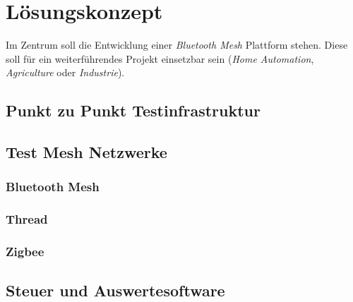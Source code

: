 \clearpage
\section{Lösungskonzept}\label{sec:Loesungskonzept}


Im Zentrum soll die Entwicklung einer \textit{Bluetooth Mesh} Plattform stehen. Diese soll für ein weiterführendes Projekt einsetzbar sein (\textit{Home Automation}, \textit{Agriculture} oder \textit{Industrie}). 

\subsection{Punkt zu Punkt Testinfrastruktur}\label{subsec:PunktzuPunktTestinfrastruktur}


\subsection{Test Mesh Netzwerke}\label{subsec:TestMeshNetzwerke}

\subsubsection{Bluetooth Mesh}\label{subsubsection:Bluetooth Mesh}

\subsubsection{Thread}\label{subsubsection:Thread} 

\subsubsection{Zigbee}\label{subsubsection:Zigbee}


\subsection{Steuer und Auswertesoftware}\label{subsec:SteuerundAuswertesoftware}

